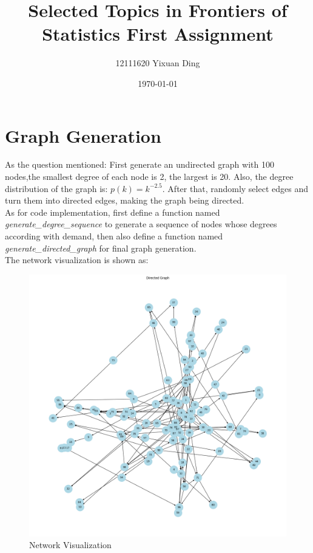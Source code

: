 \documentclass{article}
\begin{document}
	
	\title{Selected Topics in Frontiers of Statistics First Assignment}
	\author{12111620 Yixuan Ding}
	\date{\today}
	\maketitle
	\section*{Graph Generation}
	As the question mentioned: First generate an undirected graph with 100 nodes,the smallest degree of each node is 2, the largest is 20. Also, the degree distribution of the graph is: $p(k) = k^{-2.5}$. After that, randomly select edges and turn them into directed edges, making the graph being directed.\\
	As for code implementation, first define a function named \textit{generate\_degree\_sequence} to generate a sequence of nodes whose degrees according with demand, then also define a function named \textit{generate\_directed\_graph} for final graph generation.\\
	The network visualization is shown as:
	\begin{figure}[H]
		\centering
		\includegraphics[scale=0.32]{network.png}
		\caption{Network Visualization}
	\end{figure}
	
\end{document}
